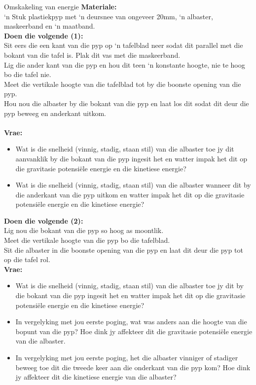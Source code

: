 \begin{activity}{Omskakeling van energie}
\textbf{Materiale:}\\
‘n Stuk plastiekpyp met ‘n deursnee van ongeveer 20mm, ‘n albaster, maskeerband en ‘n maatband.  \\
\textbf{Doen die volgende (1):}\\
Sit eers die een kant van die pyp op ‘n tafelblad neer sodat dit parallel met die bokant van die tafel is. Plak dit vas met die maskeerband. \\
Lig die ander kant van die pyp en hou dit teen ‘n konstante hoogte, nie te hoog bo die tafel nie.\\
Meet die vertikale hoogte van die tafelblad tot by die boonste opening van die pyp. \\
Hou nou die albaster by die bokant van die pyp en laat los dit sodat dit deur die pyp beweeg en anderkant uitkom.\\ \\
\textbf{Vrae:}\\ 
\begin{itemize}
\item Wat is die snelheid (vinnig, stadig, staan stil) van die albaster toe jy dit aanvanklik by die bokant van die pyp ingesit het en watter impak het dit op die gravitasie potensiële energie en die kinetiese energie?
\item Wat is die snelheid (vinnig, stadig, staan stil) van die albaster wanneer dit by die anderkant van die pyp uitkom en watter impak het dit op die gravitasie potensiële energie en die kinetiese energie?
\end{itemize}

\textbf{Doen die volgende (2):}\\
Lig nou die bokant van die pyp so hoog as moontlik. \\
Meet die vertikale hoogte van die pyp bo die tafelblad. \\
Sit die albaster in die boonste opening van die pyp en laat dit deur die pyp tot op die tafel rol.\\
\textbf{Vrae:}\\ 
\begin{itemize}
\item Wat is die snelheid (vinnig, stadig, staan stil) van die albaster toe jy dit by die bokant van die pyp ingesit het en watter impak het dit op die gravitasie potensiële energie en die kinetiese energie?
\item In vergelyking met jou eerste poging, wat was anders aan die hoogte van die bopunt van die pyp? Hoe dink jy affekteer dit die gravitasie potensiële energie van die albaster.
\item In vergelyking met jou eerste poging, het die albaster vinniger of stadiger beweeg toe dit die tweede keer aan die onderkant van die pyp kom? Hoe dink jy affekteer dit die kinetiese energie van die albaster?
\end{itemize}
\end{activity}

